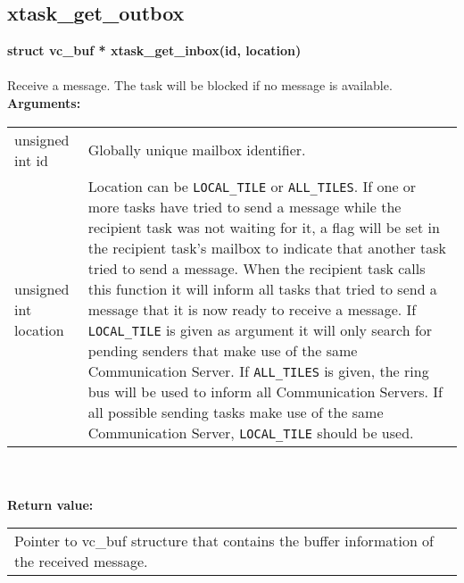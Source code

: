 \begin{samepage}
\subsection{xtask\_get\_outbox}
\noindent
\textbf{struct vc\_buf * xtask\_get\_inbox(id, location)}\\\\
Receive a message. The task will be blocked if no message is available.\\

\noindent
\textbf{Arguments:}\\
\indent\begin{tabular}{ p{4.5cm}  p{9cm} }
unsigned int id          & Globally unique mailbox identifier. \\
unsigned int location    & Location can be \verb|LOCAL_TILE| or \verb|ALL_TILES|.
                           If one or more tasks have tried to send a message 
                           while the recipient task was not waiting for it, 
                           a flag will be  set in the recipient task's mailbox 
                           to indicate that another task tried to send a message.
                           When the recipient task calls this function it will 
                           inform all tasks that tried to send a message that it
                           is now ready to receive a message. If \verb|LOCAL_TILE|
                           is given as argument it will only search for pending
                           senders that make use of the same Communication Server.
                           If \verb|ALL_TILES| is given, the ring bus will be used
                           to inform all Communication Servers. If all possible
                           sending tasks make use of the same Communication Server,
                           \verb|LOCAL_TILE| should be used.           
\end{tabular}\\\\

\noindent
\textbf{Return value:}\\
\indent\begin{tabular}{  p{13.5cm} }
Pointer to vc\_buf structure that contains the
buffer information of the received message.
\end{tabular}
\end{samepage}

